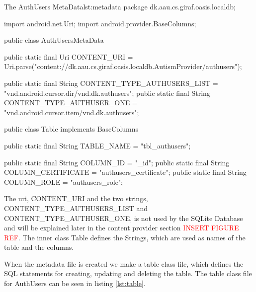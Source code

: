 \begin{Java}{The AuthUsers MetaData}{lst:metadata}
package dk.aau.cs.giraf.oasis.localdb;

import android.net.Uri;
import android.provider.BaseColumns;

public class AuthUsersMetaData {

	public static final Uri CONTENT_URI = Uri.parse("content://dk.aau.cs.giraf.oasis.localdb.AutismProvider/authusers");

	public static final String CONTENT_TYPE_AUTHUSERS_LIST = "vnd.android.cursor.dir/vnd.dk.authusers";
	public static final String CONTENT_TYPE_AUTHUSER_ONE = "vnd.android.cursor.item/vnd.dk.authusers";

	public class Table implements BaseColumns {
		public static final String TABLE_NAME = "tbl_authusers";

		public static final String COLUMN_ID = "_id";
		public static final String COLUMN_CERTIFICATE = "authusers_certificate";
		public static final String COLUMN_ROLE = "authusers_role";
	}
}
\end{Java}

The uri, CONTENT_URI and the two strings, CONTENT_TYPE_AUTHUSERS_LIST and CONTENT_TYPE_AUTHUSER_ONE, is not used by the SQLite Database and will be explained later in the content provider section \textcolor{red}{INSERT FIGURE REF}. The inner class Table defines the Strings, which are used as names of the table and the columns.

When the metadata file is created we make a table class file, which defines the SQL statements for creating, updating and deleting the table. The table class file for AuthUsers can be seen in listing \vref{lst:table}.

